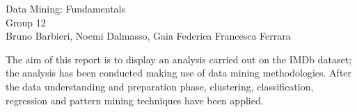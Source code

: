 \documentclass[11pt,openany]{report}
\begin{document}

\begin{center} %
     {\LARGE { Data Mining: Fundamentals}}\\
     \vspace{2cm}
    {\Large { Group 12 }}\\
     \vspace{2cm}
     {\large { Bruno Barbieri, Noemi Dalmasso, Gaia Federica Francesca Ferrara }}
\end{center}

The aim of this report is to display an analysis carried out on the IMDb dataset; the analysis has been conducted making use of data mining methodologies. 
After the data understanding and preparation phase, clustering, classification, regression and pattern mining techniques have been applied.


  



\tableofcontents

%
\end{document}
